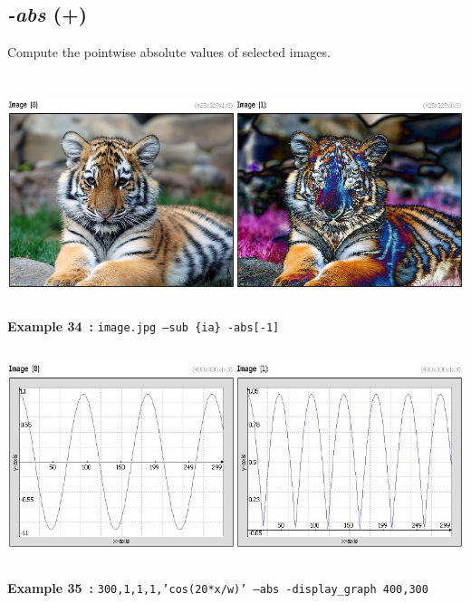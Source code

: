 \documentclass[a4paper,11pt,twoside]{book}
\begin{document}
\subsection{\emph{-abs} (+)}\vspace*{-0.5em}
Compute the pointwise absolute values of selected images.
\begin{center}\includegraphics[keepaspectratio=true,height=7cm,width=\textwidth]{img/gmic_def34.jpg}\\
{\footnotesize \textbf{Example 34~:} \texttt{image.jpg --sub \{ia\} -abs[-1]}}
\\\includegraphics[keepaspectratio=true,height=7cm,width=\textwidth]{img/gmic_def35.jpg}\\
{\footnotesize \textbf{Example 35~:} \texttt{300,1,1,1,'cos(20*x/w)' --abs -display\_graph 400,300}}
\end{center}
\end{document}
